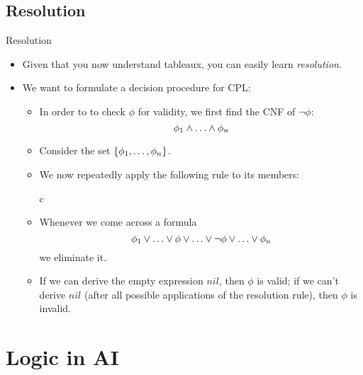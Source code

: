 \subsection{Resolution}
\begin{frame}{Resolution}

  \begin{itemize}
  \item Given that you now understand tableaux, you can easily learn
    \emph{resolution}.

  \item We want to formulate a decision procedure for CPL:

    \begin{itemize}
    \item  In order to to check $\phi$ for validity, we first find the
      CNF of $\neg\phi$: \[\phi_1\land \mathellipsis\land\phi_n\]
    \item Consider the set $\{\phi_1, \mathellipsis,\phi_n\}$.
    \item We now repeatedly apply the following rule to its members:
      
      \begin{center}
        \begin{tabular}{c}
        \end{tabular}
      \end{center}
      \item Whenever we come across a formula \[\phi_1\lor
        \mathellipsis
        \lor\phi\lor\mathellipsis\lor\neg\phi\lor\mathellipsis\lor\phi_n\]
      we eliminate it.
     \item If we can derive the empty expression $nil$, then $\phi$ is
       valid; if we can't derive $nil$ (after all possible
       applications of the resolution rule), then $\phi$ is invalid.
    \end{itemize}

      
  \end{itemize}
  
\end{frame}
             

\section{Logic in AI}

